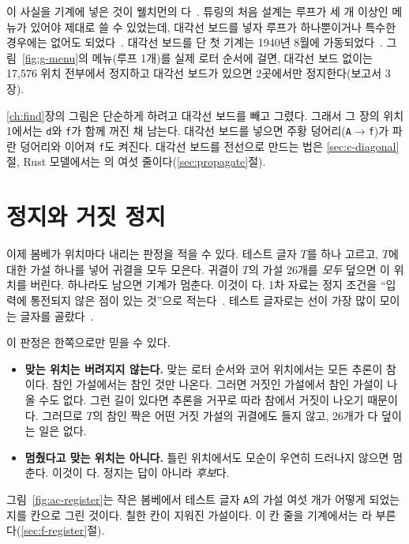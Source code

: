 이 사실을 기계에 넣은 것이 웰치먼의 다~\cite{welchman1986bomba,carter2010bombe}.
튜링의 처음 설계는 루프가 세 개 이상인 메뉴가 있어야 제대로 쓸 수 있었는데, 대각선 보드를 넣자 루프가 하나뿐이거나
특수한 경우에는 없어도 되었다~\cite{carter2010bombe}. 대각선 보드를 단 첫 기계는 1940년 8월에
가동되었다~\cite{jackson-bh01,cryptomuseum-bombe}. 그림~\ref{fig:g-menu}의 메뉴(루프 1개)를 실제 로터 순서에 걸면,
대각선 보드 없이는 17,576 위치 전부에서 정지하고 대각선 보드가 있으면 2곳에서만 정지한다(보고서 3장).

\Ours \ref{ch:find}장의 그림은 단순하게 하려고 대각선 보드를 빼고 그렸다. 그래서 그 장의 위치 1에서는 \texttt{d}와
\texttt{f}가 함께 꺼진 채 남는다. 대각선 보드를 넣으면 주황 덩어리(\texttt{A}$\to$\texttt{f})가 파란 덩어리와
이어져 \texttt{f}도 켜진다. 대각선 보드를 전선으로 만드는 법은 \ref{sec:c-diagonal}절, Rust 모델에서는
의 여섯 줄이다(\ref{sec:propagate}절).

\section{정지와 거짓 정지}\label{sec:ac-stop}

이제 봄베가 위치마다 내리는 판정을 적을 수 있다. 테스트 글자 $T$를 하나 고르고, $T$에 대한 가설 하나를 넣어 귀결을
모두 모은다. 귀결이 $T$의 가설 26개를 \emph{모두} 덮으면 이 위치를 버린다. 하나라도 남으면 기계가 멈춘다. 이것이
다. 1차 자료는 정지 조건을 ``입력에 통전되지 않은 점이 있는 것''으로 적는다~\cite[32]{us6812report1944}.
테스트 글자로는 선이 가장 많이 모이는 글자를 골랐다~\cite[7]{us6812report1944}.

\Why 이 판정은 한쪽으로만 믿을 수 있다.

\begin{itemize}
\item \textbf{맞는 위치는 버려지지 않는다.} 맞는 로터 순서와 코어 위치에서는 모든 추론이 참이다. 참인 가설에서는 참인
것만 나온다. 그러면 거짓인 가설에서 참인 가설이 나올 수도 없다. 그런 길이 있다면 추론을 거꾸로 따라 참에서 거짓이
나오기 때문이다. 그러므로 $T$의 참인 짝은 어떤 거짓 가설의 귀결에도 들지 않고, 26개가 다 덮이는 일은 없다.
\item \textbf{멈췄다고 맞는 위치는 아니다.} 틀린 위치에서도 모순이 우연히 드러나지 않으면 멈춘다. 이것이
다. 정지는 답이 아니라 \emph{후보}다.
\end{itemize}

그림~\ref{fig:ac-register}는 작은 봄베에서 테스트 글자 \texttt{A}의 가설 여섯 개가 어떻게 되었는지를 칸으로 그린 것이다.
칠한 칸이 지워진 가설이다. 이 칸 줄을 기계에서는 라 부른다(\ref{sec:f-register}절).

